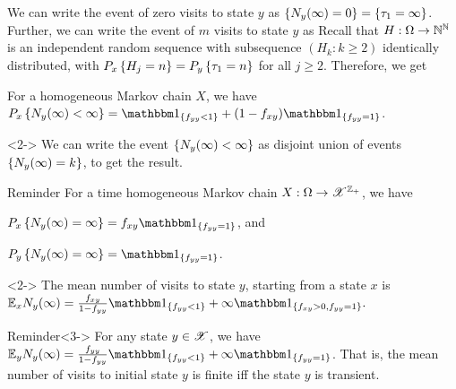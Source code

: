 \documentclass[12pt,aspectratio=169]{beamer}
\begin{document}
\begin{frame}
\begin{Proof} 
We can write the event of zero visits to state $y$ as $\left\{N_y(\infty) = 0\right\} = \left\{\tau_1 = \infty\right\}$. 
Further, we can write the event of $m$ visits to state $y$ as 
Recall that $H:\Omega\to\mathbb{N}^{\mathbb{N}}$ is an independent random sequence with subsequence $(H_k: k \ge 2)$ identically distributed, 
with $P_x\left\{H_j = n\right\} = P_y\left\{\tau_1 =n\right\}$ for all $j \ge 2$.  
Therefore, we get 
\end{Proof}
\end{frame}
\begin{frame}
\begin{cor}
\label{cor:01law}
For a homogeneous Markov chain $X$, we have 
$P_x\set{N_y(\infty) < \infty} = \SetIn{f_{yy} < 1} + (1-f_{xy})\SetIn{f_{yy} = 1}$. 
\end{cor}
\begin{Proof}<2->
We can write the event $\left\{N_y(\infty) < \infty\right\}$ as disjoint union of events $\left\{N_y(\infty) = k\right\}$, to get the result. 
\end{Proof}
\end{frame}

\begin{frame}
\begin{block}{Reminder} 
For a time homogeneous Markov chain $X: \Omega \to \mathscr{X}^{\mathbb{Z}_+}$, we have 
\begin{compactenum}[(i)]
\item $P_x\set{N_y(\infty) = \infty} = f_{xy}\SetIn{f_{yy}=1}$, and 
\item $P_y\set{N_y(\infty) = \infty} = \SetIn{f_{yy}=1}$.
\end{compactenum} 
\end{block}
\begin{cor}<2->
The mean number of visits to state $y$, starting from a state $x$ is 
$
\E_xN_y(\infty) = \frac{f_{xy}}{1-f_{yy}}\SetIn{f_{yy} < 1} + \infty\SetIn{f_{xy} > 0, f_{yy} = 1}.
$
\end{cor}
\begin{block}{Reminder}<3->
For any state $y \in \mathscr{X}$, we have $\E_yN_y(\infty) = \frac{f_{yy}}{1-f_{yy}}\SetIn{f_{yy}<1} + \infty\SetIn{f_{yy}=1}$. 
That is, the mean number of visits to initial state $y$ is finite iff the state $y$ is transient.  
\end{block}
\end{frame}
\end{document}
